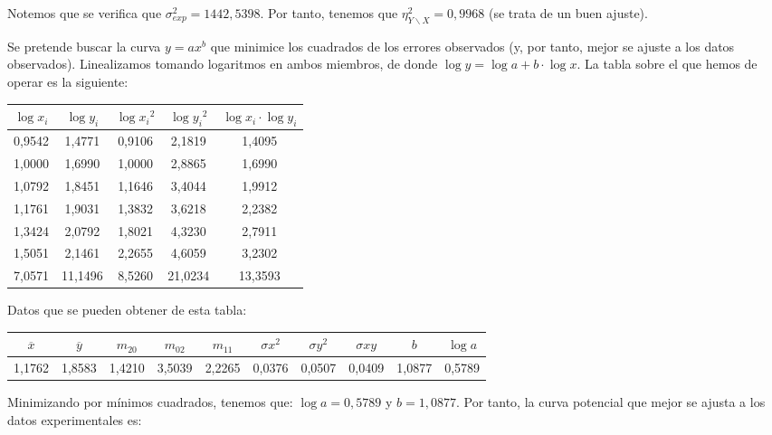 Notemos que se verifica que $\sigma_{exp}^2 = 1442,5398$. Por tanto, tenemos que $\eta_{Y\backslash X}^2 = 0,9968$ (se trata de un buen ajuste).

\subproblem

Se pretende buscar la curva $y =  ax^b$ que minimice los cuadrados de los errores observados (y, por tanto, mejor se ajuste a los datos observados). Linealizamos tomando logaritmos en ambos miembros, de donde $\log{y} = \log{a} + b·\log{x}$. La tabla sobre el que hemos de operar es la siguiente:

\begin{center}
	\begin{tabular}{ c|c|c c c }
	
	$\log{x_i}$ & $\log{y_i}$ & $\log{x_i}^2$ & $\log{y_i}^2$ & $\log{x_i}·\log{y_i}$ \\ \hline
	0,9542 & 1,4771 & 0,9106 & 2,1819 & 1,4095 \\ 
	1,0000 & 1,6990 & 1,0000 & 2,8865 & 1,6990 \\ 
	1,0792 & 1,8451 & 1,1646 & 3,4044 & 1,9912 \\ 
	1,1761 & 1,9031 & 1,3832 & 3,6218 & 2,2382 \\ 
	1,3424 & 2,0792 & 1,8021 & 4,3230 & 2,7911 \\ 
	1,5051 & 2,1461 & 2,2655 & 4,6059 & 3,2302 \\ \hline
	7,0571 & 11,1496 & 8,5260 & 21,0234 & 13,3593 \\ 
\end{tabular}
\end{center}

Datos que se pueden obtener de esta tabla:

\vspace{1em}

\tiny
\begin{tabular}{|c|c|c|c|c|c|c|c|c|c|}
	\hline
	$\overline{x}$ & $\overline{y}$ & $m_{20}$ & $m_{02}$ & $m_{11}$ & $\sigma{x}^2$ & $\sigma{y}^2$ & $\sigma{xy}$ &  $b$ & $\log{a}$  \\ \hline
	1,1762 & 1,8583 & 1,4210 & 3,5039 & 2,2265 & 0,0376 & 0,0507 & 0,0409 & 1,0877 & 0,5789 \\ \hline
\end{tabular}
\normalsize

\vspace{1em}

Minimizando por mínimos cuadrados, tenemos que: $\log{a} = 0,5789$ y $b=1,0877$. Por tanto, la curva potencial que mejor se ajusta a los datos experimentales es:

